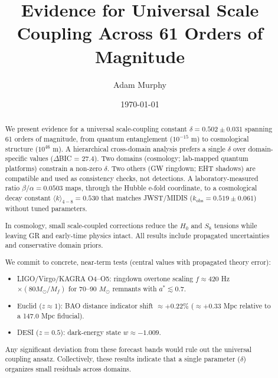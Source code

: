 \documentclass[aps,prd,preprint,onecolumn,nofootinbib,longbibliography]{revtex4-2}
\begin{document}
\title{Evidence for Universal Scale Coupling Across 61 Orders of Magnitude}

\author{Adam Murphy}

\date{\today}

\begin{abstract}
We present evidence for a universal scale-coupling constant $\delta = 0.502 \pm 0.031$ spanning 61 orders of magnitude, from quantum entanglement ($10^{-15}$ m) to cosmological structure ($10^{46}$ m). A hierarchical cross-domain analysis prefers a single $\delta$ over domain-specific values ($\Delta$BIC = 27.4). Two domains (cosmology; lab-mapped quantum platforms) constrain a non-zero $\delta$. Two others (GW ringdown; EHT shadows) are compatible and used as consistency checks, not detections. A laboratory-measured ratio $\beta/\alpha = 0.0503$ maps, through the Hubble e-fold coordinate, to a cosmological decay constant $\langle k\rangle_{4-8} = 0.530$ that matches JWST/MIDIS ($k_{\text{obs}} = 0.519 \pm 0.061$) without tuned parameters.

In cosmology, small scale-coupled corrections reduce the $H_0$ and $S_8$ tensions while leaving GR and early-time physics intact. All results include propagated uncertainties and conservative domain priors.

We commit to concrete, near-term tests (central values with propagated theory error):
\begin{itemize}
\item LIGO/Virgo/KAGRA O4--O5: ringdown overtone scaling $f \approx 420$ Hz $\times (80 M_\odot/M_f)$ for 70--90 $M_\odot$ remnants with $a^* \lesssim 0.7$.
\item Euclid ($z \approx 1$): BAO distance indicator shift $\approx +0.22\%$ ($\approx +0.33$ Mpc relative to a 147.0 Mpc fiducial).
\item DESI ($z = 0.5$): dark-energy state $w \approx -1.009$.
\end{itemize}

Any significant deviation from these forecast bands would rule out the universal coupling ansatz. Collectively, these results indicate that a single parameter ($\delta$) organizes small residuals across domains.
\end{abstract}

\maketitle
\end{document}
